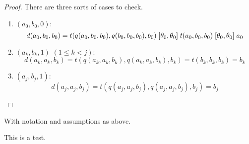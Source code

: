 \begin{proof} There are three sorts of cases to check.
\begin{enumerate}[1.]
\item $(a_0, b_0, 0)$: 
\begin{equation*}
d(a_0, b_0, b_0) =  
t(q(a_0,b_0,b_0), q(b_0,b_0,b_0), b_0) 
\mathrel{[\theta_0, \theta_0]} 
t(a_0, b_0, b_0) \mathrel{[\theta_0, \theta_0]} 
a_0
\end{equation*}
 
\item $(a_k, b_k, 1)$ $(1\leq k < j)$: 
\begin{equation*}
d(a_k, a_k, b_k) =  
t(q(a_k,a_k,b_k), q(a_k,a_k,b_k), b_k) 
= t(b_k, b_k, b_k) = b_k
\end{equation*}

\item $(a_j, b_j, 1)$: 
\begin{equation*}
d(a_j, a_j, b_j) =  
t(q(a_j,a_j,b_j), q(a_j,a_j,b_j), b_j) = b_j 
\end{equation*}
\end{enumerate}
\end{proof}








































With notation and assumptions as above.

\begin{theorem}
This is a test.
\end{theorem}







%




